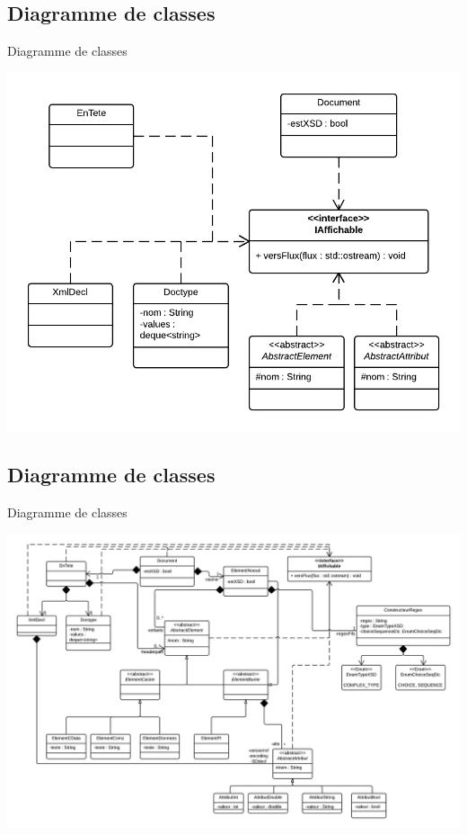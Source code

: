 \documentclass[aspectratio=169]{beamer}
\begin{document}
\subsection{Diagramme de classes}
\begin{frame}{Diagramme de classes}
\begin{center}
  \includegraphics[scale=0.3]{ddc_iaff}
\end{center}
\end{frame}

\subsection{Diagramme de classes}
\begin{frame}{Diagramme de classes}
\begin{center}
 \includegraphics[scale=0.17]{diagdcla}
\end{center}
\end{frame}
\end{document}
